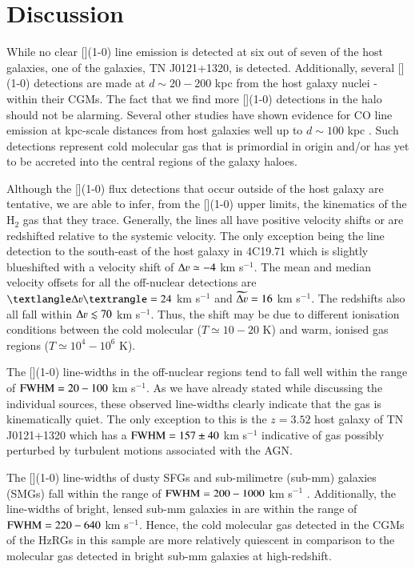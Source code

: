 \section{Discussion}
While no clear [](1-0) line emission is detected at six out of seven of the host galaxies, one of the galaxies, TN J0121+1320, is detected. Additionally, several [](1-0) detections are made at $d \sim 20 - 200$ kpc from the host galaxy nuclei - within their CGMs. The fact that we find more [](1-0) detections in the halo should not be alarming. Several other studies have shown evidence for CO line emission at kpc-scale  distances from host galaxies well up to $d \sim 100$ kpc \citep[e.g.][]{Greve2004,deBreuck2005,Ivison2012,Emonts2014}. Such detections represent cold molecular gas that is primordial in origin and/or has yet to be accreted into the central regions of the galaxy haloes. 

Although the [](1-0) flux detections that occur outside of the host galaxy are tentative, we are able to infer, from the [](1-0) upper limits, the kinematics of the H$_2$ gas that they trace. Generally, the lines all have positive velocity shifts or are redshifted relative to the systemic velocity. The only exception being the line detection to the south-east of the host galaxy in 4C19.71 which is slightly blueshifted with a velocity shift of $\Delta \varv \simeq -4$ km s$^{-1}.$ The mean and median velocity offsets for all the off-nuclear detections are $\textlangle \Delta \varv \textrangle = 24$ km s$^{-1}$ and $\widetilde{\Delta \varv} = 16$ km s$^{-1}.$ The redshifts also all fall within $\Delta \varv \lesssim 70$ km s$^{-1}.$ Thus, the shift may be due to different ionisation conditions between the cold molecular ($T \simeq 10 - 20$ K) and warm, ionised gas regions ($T \simeq 10^4 - 10^6$ K). 

The [](1-0) line-widths in the off-nuclear regions tend to fall well within the range of $\rm FWHM = 20 - 100$ km s$^{-1}.$ As we have already stated while discussing the individual sources, these observed line-widths clearly indicate that the gas is kinematically quiet. The only exception to this is the $z=3.52$ host galaxy of TN J0121+1320 which has a $\rm FWHM = 157 \pm 40$ km s$^{-1}$ indicative of gas possibly perturbed by turbulent motions associated with the AGN. 

The [](1-0) line-widths of dusty SFGs and sub-milimetre (sub-mm) galaxies (SMGs) fall within the range of $\rm FWHM = 200 - 1000$ km s$^{-1}$ \citep{Alaghband-Zadeh2013,Bothwell2017}. Additionally, the line-widths of bright, lensed sub-mm galaxies in \citet{Nesvadba2019} are within the range of $\rm FWHM = 220 - 640$ km s$^{-1}.$ Hence, the cold molecular gas detected in the CGMs of the HzRGs in this sample are more relatively quiescent in comparison to the molecular gas detected in bright sub-mm galaxies at high-redshift.  

